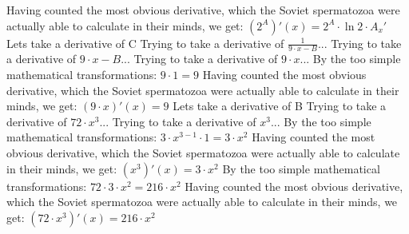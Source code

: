 \documentclass[a4paper, 12pt]{article}
\begin{document}
Having counted the most obvious derivative, which the Soviet spermatozoa were actually able to calculate in their minds, we get:
$({{2} ^ {A}})'(x) = {{{{2} ^ {A}} \cdot  \ln {{2}} } \cdot {A_x'}}$\newline
\newline
Lets take a derivative of C\newline
Trying to take a derivative of $ \frac {{1}} {{{{9} \cdot {x}} - {B}}}$...\newline
\newline
Trying to take a derivative of ${{{9} \cdot {x}} - {B}}$...\newline
\newline
Trying to take a derivative of ${{9} \cdot {x}}$...\newline
\newline
By the too simple mathematical transformations:
 ${{9} \cdot {1}} = {9}$ 
 \newline
 \newline 
Having counted the most obvious derivative, which the Soviet spermatozoa were actually able to calculate in their minds, we get:
$({{9} \cdot {x}})'(x) = {9}$\newline
\newline
Lets take a derivative of B\newline
Trying to take a derivative of ${{72} \cdot {{x} ^ {3}}}$...\newline
\newline
Trying to take a derivative of ${{x} ^ {3}}$...\newline
\newline
By the too simple mathematical transformations:
 ${{{3} \cdot {{x} ^ {{3} - {1}}}} \cdot {1}} = {{3} \cdot {{x} ^ {2}}}$ 
 \newline
 \newline 
Having counted the most obvious derivative, which the Soviet spermatozoa were actually able to calculate in their minds, we get:
$({{x} ^ {3}})'(x) = {{3} \cdot {{x} ^ {2}}}$\newline
\newline
By the too simple mathematical transformations:
 ${{72} \cdot {{3} \cdot {{x} ^ {2}}}} = {{216} \cdot {{x} ^ {2}}}$ 
 \newline
 \newline 
Having counted the most obvious derivative, which the Soviet spermatozoa were actually able to calculate in their minds, we get:
$({{72} \cdot {{x} ^ {3}}})'(x) = {{216} \cdot {{x} ^ {2}}}$\newline
\end{document}
